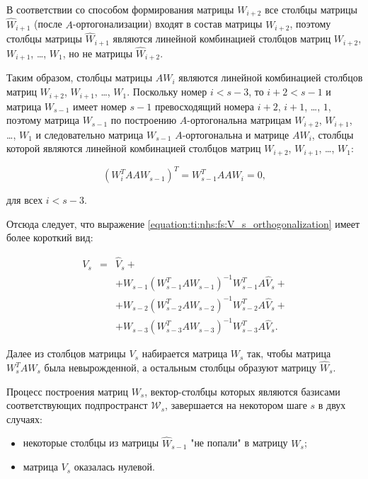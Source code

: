 В соответствии со способом формирования матрицы $W_{i+2}$ все столбцы матрицы $\widehat{W}_{i+1}$ (после $A$-ортогонализации) входят в
состав матрицы $W_{i+2}$, поэтому столбцы матрицы $\widehat{W}_{i+1}$ являются линейной комбинацией столбцов матриц $W_{i+2}$,
$W_{i+1}$, \dots, $W_1$, но не матрицы $\widehat{W}_{i+2}$.

Таким образом, столбцы матрицы $A W_i$ являются линейной комбинацией столбцов матриц $W_{i+2}$, $W_{i+1}$, \dots, $W_1$. Поскольку номер
$i < s-3$, то $i+2 < s-1$ и матрица $W_{s-1}$ имеет номер $s-1$ превосходящий номера $i+2$, $i+1$, \dots, $1$, поэтому матрица
$W_{s-1}$ по построению $A$-ортогональна матрицам $W_{i+2}$, $W_{i+1}$, \dots, $W_1$ и следовательно матрица $W_{s-1}$
$A$-ортогональна и матрице $A W_i$, столбцы которой являются линейной комбинацией столбцов матриц $W_{i+2}$, $W_{i+1}$, \dots, $W_1$:

$$
	\left ( W_i^T A A W_{s-1} \right ) ^T = W_{s-1}^T A A W_i = 0,
$$

для всех $i < s-3$.

Отсюда следует, что выражение \ref{equation:ti:nhs:fs:V_s_orthogonalization} имеет более короткий вид:

$$
	\begin{array}{ccl}
		V_s & = & \widehat{V}_s + \\
	        &   & + W_{s-1} \left ( W_{s-1}^T A W_{s-1} \right ) ^{-1} W_{s-1}^T A \widehat{V}_s + \\
	        &   & + W_{s-2} \left ( W_{s-2}^T A W_{s-2} \right ) ^{-1} W_{s-2}^T A \widehat{V}_s + \\
	        &   & + W_{s-3} \left ( W_{s-3}^T A W_{s-3} \right ) ^{-1} W_{s-3}^T A \widehat{V}_s.
	\end{array}
$$

Далее из столбцов матрицы $V_s$ набирается матрица $W_s$ так, чтобы матрица $W_s^T A W_s$ была невырожденной, а остальным столбцы образуют
матрицу $\widehat{W}_s$.

Процесс построения матриц $W_s$, вектор-столбцы которых являются базисами соответствующих подпространст $\mathcal W_s$, завершается 
на некотором шаге $s$ в двух случаях:

\begin{itemize}
	\item некоторые столбцы из матрицы $\widehat{W}_{s-1}$ "не попали"{} в матрицу $W_s$;
	\item матрица $V_s$ оказалась нулевой.
\end{itemize}

